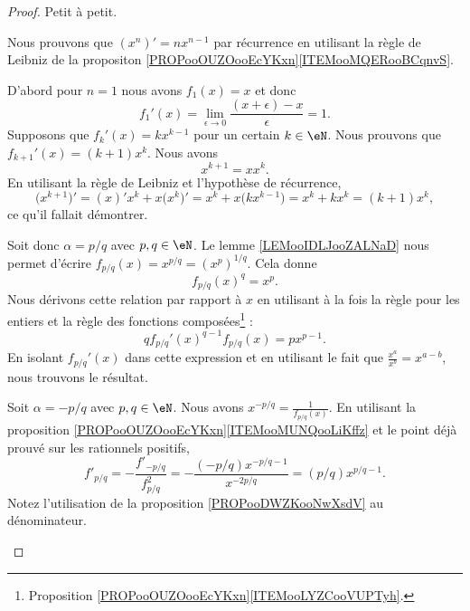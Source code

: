 \begin{proof}
	Petit à petit.
	\begin{subproof}
		\spitem[Naturel]
		Nous prouvons que \( (x^n)'=nx^{n-1}\) par récurrence en utilisant la règle de Leibniz de la propositon  \ref{PROPooOUZOooEcYKxn}\ref{ITEMooMQERooBCqnvS}.

		D'abord pour \( n=1\) nous avons \( f_1(x)=x\) et donc
		\begin{equation}
			f_1'(x)=\lim_{\epsilon\to 0}\frac{ (x+\epsilon)-x }{ \epsilon }=1.
		\end{equation}
		Supposons que \( f_k'(x)=kx^{k-1}\) pour un certain \( k\in \eN\). Nous prouvons que \( f_{k+1}'(x)=(k+1)x^{k}\).  Nous avons
		\begin{equation}
			x^{k+1}=xx^k.
		\end{equation}
		En utilisant la règle de Leibniz et l'hypothèse de récurrence,
		\begin{equation}
			\big( x^{k+1} \big)'=(x)'x^k+x\big( x^k \big)'
			=x^k+x\big( kx^{k-1} \big)
			=x^k+kx^k
			=(k+1)x^k,
		\end{equation}
		ce qu'il fallait démontrer.

		Soit donc \( \alpha=p/q\) avec \( p,q\in \eN\). Le lemme \ref{LEMooIDLJooZALNaD} nous permet d'écrire \( f_{p/q}(x)=x^{p/q}=(x^p)^{1/q}\). Cela donne
		\begin{equation}
			f_{p/q}(x)^q=x^p.
		\end{equation}
		Nous dérivons cette relation par rapport à \( x\) en utilisant à la fois la règle pour les entiers et la règle des fonctions composées\footnote{Proposition \ref{PROPooOUZOooEcYKxn}\ref{ITEMooLYZCooVUPTyh}.} :
		\begin{equation}
			qf_{p/q}'(x)^{q-1}f_{p/q}(x)=px^{p-1}.
		\end{equation}
		En isolant \( f_{p/q}'(x)\) dans cette expression et en utilisant le fait que \( \frac{ x^a }{ x^b }=x^{a-b}\), nous trouvons le résultat.


		Soit \( \alpha=-p/q\) avec \( p,q\in \eN\). Nous avons \( x^{-p/q}=\frac{1}{ f_{p/q}(x) }\). En utilisant la proposition \ref{PROPooOUZOooEcYKxn}\ref{ITEMooMUNQooLiKffz} et le point déjà prouvé sur les rationnels positifs,
		\begin{equation}
			f'_{p/q}=-\frac{ f'_{-p/q} }{ f_{p/q}^2 }=-\frac{ (-p/q)x^{-p/q-1} }{ x^{-2p/q} }=(p/q)x^{p/q-1}.
		\end{equation}
		Notez l'utilisation de la proposition \ref{PROPooDWZKooNwXsdV} au dénominateur.


\end{subproof}
\end{proof}
